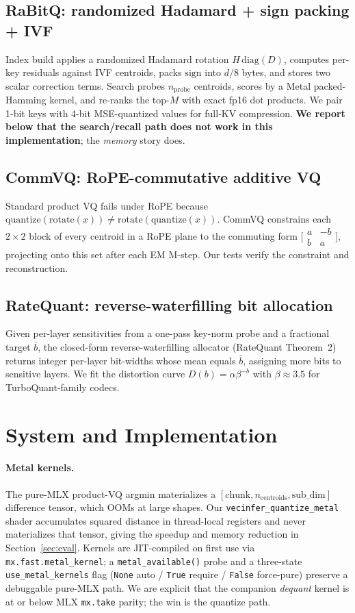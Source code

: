 \documentclass[11pt]{article}
\begin{document}
\subsection{RaBitQ: randomized Hadamard + sign packing + IVF}
Index build applies a randomized Hadamard rotation $H\,\mathrm{diag}(D)$,
computes per-key residuals against IVF centroids, packs $\mathrm{sign}$ into
$d/8$ bytes, and stores two scalar correction terms. Search probes
$n_{\mathrm{probe}}$ centroids, scores by a Metal packed-Hamming kernel, and
re-ranks the top-$M$ with exact fp16 dot products. We pair 1-bit keys with
4-bit MSE-quantized values for full-KV compression. \textbf{We report below
that the search/recall path does not work in this implementation}; the
\emph{memory} story does.

\subsection{CommVQ: RoPE-commutative additive VQ}
Standard product VQ fails under RoPE because
$\mathrm{quantize}(\mathrm{rotate}(x))\neq\mathrm{rotate}(\mathrm{quantize}(x))$.
CommVQ constrains each $2\times2$ block of every centroid in a RoPE plane to
the commuting form $\bigl[\begin{smallmatrix}a&-b\\b&a\end{smallmatrix}\bigr]$,
projecting onto this set after each EM M-step. Our tests verify the
constraint and reconstruction.

\subsection{RateQuant: reverse-waterfilling bit allocation}
Given per-layer sensitivities from a one-pass key-norm probe and a fractional
target $\bar b$, the closed-form reverse-waterfilling allocator (RateQuant
Theorem~2) returns integer per-layer bit-widths whose mean equals $\bar b$,
assigning more bits to sensitive layers. We fit the distortion curve
$D(b)=\alpha\beta^{-b}$ with $\beta\!\approx\!3.5$ for TurboQuant-family
codecs.

\section{System and Implementation}
\label{sec:system}
\paragraph{Metal kernels.} The pure-MLX product-VQ argmin materializes a
$[\text{chunk},n_{\mathrm{centroids}},\text{sub\_dim}]$ difference tensor,
which OOMs at large shapes. Our \texttt{vecinfer\_quantize\_metal} shader
accumulates squared distance in thread-local registers and never
materializes that tensor, giving the speedup and memory reduction in
Section~\ref{sec:eval}. Kernels are JIT-compiled on first use via
\texttt{mx.fast.metal\_kernel}; a \texttt{metal\_available()} probe and a
three-state \texttt{use\_metal\_kernels} flag (\texttt{None} auto /
\texttt{True} require / \texttt{False} force-pure) preserve a debuggable
pure-MLX path. We are explicit that the companion \emph{dequant} kernel is at
or below MLX \texttt{mx.take} parity; the win is the quantize path.
\end{document}
